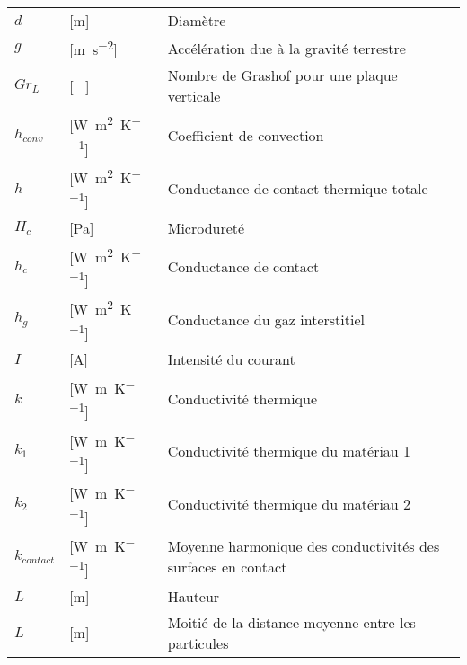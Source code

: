 \begin{longtable}{l p{2.5cm} p{4in}}
	$d$              & [\si{\metre}]                                       & Diamètre                                                     \\
	$g$              & [\si{\metre\per\square\second}]                     & Accélération due à la gravité terrestre                      \\
	$Gr_L$           & [ \ ]                                               & Nombre de Grashof pour une plaque verticale                  \\
	$h_{conv}$       & [\si{\watt\per\square\metre\per\kelvin}]            & Coefficient de convection                                    \\
	$h$              & [\si{\watt\per\square\metre\per\kelvin}]            & Conductance de contact thermique totale                      \\
	$H_c$            & [\si{\pascal}]                                      & Microdureté                                                  \\
	$h_c$            & [\si{\watt\per\square\metre\per\kelvin}]            & Conductance de contact                                       \\
	$h_g$            & [\si{\watt\per\square\metre\per\kelvin}]            & Conductance du gaz interstitiel                              \\
	$I$              & [\si{\ampere}]                                      & Intensité du courant                                         \\
	$k$              & [\si{\watt\per\metre\per\kelvin}]                   & Conductivité thermique                                       \\
	$k_1$            & [\si{\watt\per\metre\per\kelvin}]                   & Conductivité thermique du matériau 1                         \\
	$k_2$            & [\si{\watt\per\metre\per\kelvin}]                   & Conductivité thermique du matériau 2                         \\
	$k_{contact}$    & [\si{\watt\per\metre\per\kelvin}]                   & Moyenne harmonique des conductivités des surfaces en contact \\
	$L$              & [\si{\metre}]                                       & Hauteur                                                      \\
	$L$              & [\si{\metre}]                                       & Moitié de la distance moyenne entre les particules           \\

\end{longtable}
